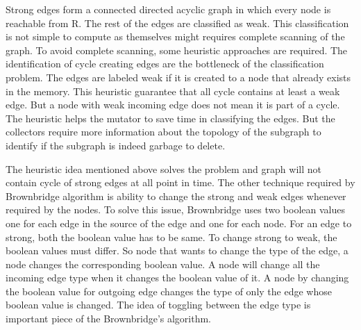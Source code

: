 Strong edges form a connected directed acyclic graph in which every node is reachable from R. The rest of the edges are classified as weak. This classification is not simple to compute as themselves might requires complete scanning of the graph. To avoid complete scanning, some heuristic approaches are required. The identification of cycle creating edges are the bottleneck of the classification problem. The edges are  labeled weak if it is created to a node that already exists in the memory. This heuristic guarantee that all cycle contains at least a weak edge. But a node with weak incoming edge does not mean it is part of a cycle. The heuristic helps the mutator to save time in classifying the edges. But the collectors require more information about the topology of the subgraph to identify if the subgraph is indeed garbage to delete. 

The heuristic idea mentioned above solves the problem and graph will not contain cycle of strong edges at all point in time. The other technique required by Brownbridge algorithm is ability to change the strong and weak edges whenever required by the nodes. To solve this issue, Brownbridge uses two boolean values one for each edge in the source of the edge and one for each node. For an edge to strong, both the boolean value has to be same. To change strong to weak, the boolean values must differ. So node that wants to change the type of the edge, a node changes the corresponding boolean value. A node will change all the incoming edge type when it changes the boolean value of it. A node by changing the boolean value for outgoing edge changes the type of only the edge whose boolean value is changed. The idea of toggling between the edge type is important piece of the Brownbridge's algorithm.

